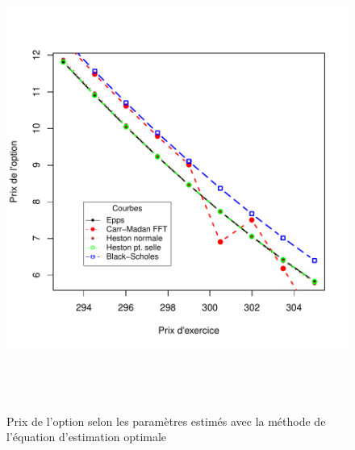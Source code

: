 \begin{figure}[!ht]
  \centering
  \includegraphics[height=6in,
  width=6in]{./graphiques/ABBEYN-callGAL-5.pdf}
  \caption{Prix de l'option selon les paramètres estimés avec la
    méthode de l'équation d'estimation optimale}
  \label{fig:prix1R1-3}
\end{figure}

